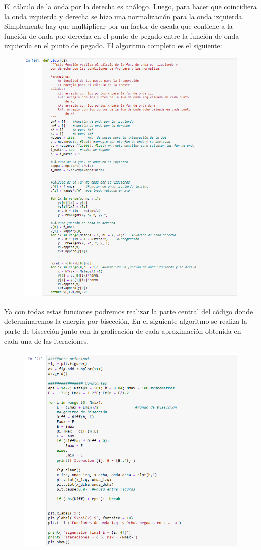 \documentclass[11pt]{article}
\begin{document}
 	El cálculo de la onda por la derecha es análogo. Luego, para hacer que coincidiera la onda izquierda y derecha se hizo una normalización para la onda izquierda. Simplemente hay que multiplicar por un factor de escala que contiene a la función de onda por derecha en el punto de pegado entre la función de onda izquierda en el punto de pegado. El algoritmo completo es el siguiente:
 	\begin{figure}[h!]
 		\centering
 		\includegraphics[width=12cm]{Img/2.8.PNG}
 	\end{figure}
 
 	Ya con todas estas funciones podremos realizar la parte central del código donde determinaremos la energía por bisección. En el siguiente algoritmo se realiza la parte de bisección junto con la graficación de cada aproximación obtenida en cada una de las iteraciones.

 	\begin{figure}[h]
 		\centering
 		\includegraphics[width=12cm]{Img/2.11.PNG}
 	\end{figure}
 	
\end{document}
